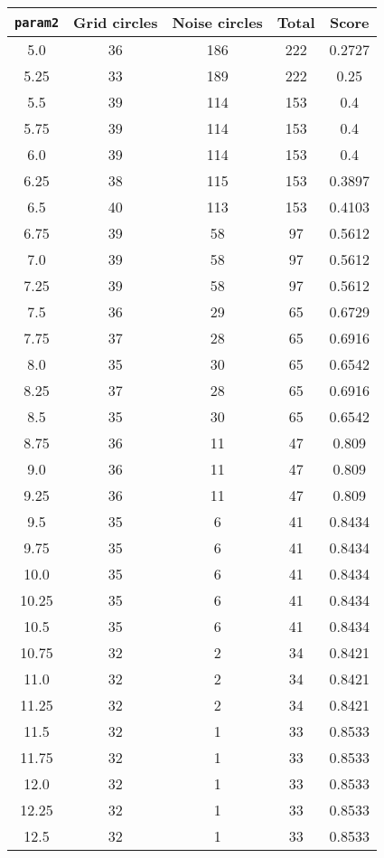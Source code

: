 \documentclass[letterpaper, 12pt]{article}
\begin{document}
\begin{longtable}{|c|c|c|c|c|}
\hline
\textbf{\texttt{param2}} & \textbf{Grid circles} & \textbf{Noise circles} & \textbf{Total} & \textbf{Score} \\
\hline
5.0 & 36 & 186 & 222 & 0.2727 \\
\hline
5.25 & 33 & 189 & 222 & 0.25 \\
\hline
5.5 & 39 & 114 & 153 & 0.4 \\
\hline
5.75 & 39 & 114 & 153 & 0.4 \\
\hline
6.0 & 39 & 114 & 153 & 0.4 \\
\hline
6.25 & 38 & 115 & 153 & 0.3897 \\
\hline
6.5 & 40 & 113 & 153 & 0.4103 \\
\hline
6.75 & 39 & 58 & 97 & 0.5612 \\
\hline
7.0 & 39 & 58 & 97 & 0.5612 \\
\hline
7.25 & 39 & 58 & 97 & 0.5612 \\
\hline
7.5 & 36 & 29 & 65 & 0.6729 \\
\hline
7.75 & 37 & 28 & 65 & 0.6916 \\
\hline
8.0 & 35 & 30 & 65 & 0.6542 \\
\hline
8.25 & 37 & 28 & 65 & 0.6916 \\
\hline
8.5 & 35 & 30 & 65 & 0.6542 \\
\hline
8.75 & 36 & 11 & 47 & 0.809 \\
\hline
9.0 & 36 & 11 & 47 & 0.809 \\
\hline
9.25 & 36 & 11 & 47 & 0.809 \\
\hline
9.5 & 35 & 6 & 41 & 0.8434 \\
\hline
9.75 & 35 & 6 & 41 & 0.8434 \\
\hline
10.0 & 35 & 6 & 41 & 0.8434 \\
\hline
10.25 & 35 & 6 & 41 & 0.8434 \\
\hline
10.5 & 35 & 6 & 41 & 0.8434 \\
\hline
10.75 & 32 & 2 & 34 & 0.8421 \\
\hline
11.0 & 32 & 2 & 34 & 0.8421 \\
\hline
11.25 & 32 & 2 & 34 & 0.8421 \\
\hline
11.5 & 32 & 1 & 33 & 0.8533 \\
\hline
11.75 & 32 & 1 & 33 & 0.8533 \\
\hline
12.0 & 32 & 1 & 33 & 0.8533 \\
\hline
12.25 & 32 & 1 & 33 & 0.8533 \\
\hline
12.5 & 32 & 1 & 33 & 0.8533 \\

\end{longtable}
\end{document}
